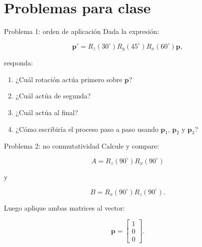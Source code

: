 \documentclass[aspectratio=169,10pt]{beamer}
\begin{document}
\section{Problemas para clase}

\begin{frame}{Problema 1: orden de aplicación}
    \small
    Dada la expresión:

    \[
    \boldsymbol{p}'=R_z(30^\circ)R_y(45^\circ)R_x(60^\circ)\boldsymbol{p},
    \]

    responda:

    \begin{enumerate}
        \item ¿Cuál rotación actúa primero sobre $\boldsymbol{p}$?
        \item ¿Cuál actúa de segunda?
        \item ¿Cuál actúa al final?
        \item ¿Cómo escribiría el proceso paso a paso usando $\boldsymbol{p}_1$, $\boldsymbol{p}_2$ y $\boldsymbol{p}_3$?
    \end{enumerate}

\end{frame}

\begin{frame}{Problema 2: no conmutatividad}
    \small
    Calcule y compare:

    \[
    A=R_z(90^\circ)R_x(90^\circ)
    \]

    y

    \[
    B=R_x(90^\circ)R_z(90^\circ).
    \]

    Luego aplique ambas matrices al vector:

    \[
    \boldsymbol{p}=\begin{bmatrix}1\\0\\0\end{bmatrix}.
    \]


\end{frame}
\end{document}
